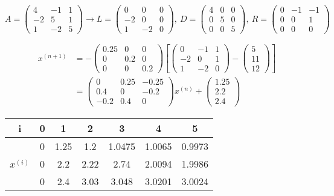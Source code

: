 \documentclass[a4paper,ngerman]{scrbook}
\begin{document}
\[
A =
\begin{pmatrix}
  4 & -1 & 1\\ -2 & 5 & 1\\ 1 & -2 & 5
\end{pmatrix}
 \to L =
 \begin{pmatrix}
   0  & 0 & 0\\ -2 & 0 & 0\\ 1 & -2 & 0
 \end{pmatrix}
 ,\ D=
 \begin{pmatrix}
   4 & 0 & 0\\ 0 & 5 & 0\\ 0 & 0 & 5
 \end{pmatrix}
 ,\ R=
 \begin{pmatrix}
   0 & -1 & -1\\ 0 & 0 & 1\\ 0 & 0 & 0
 \end{pmatrix}
\]


\begin{align*}
  x^{(n+1)} &= -
  \begin{pmatrix}
    0.25 & 0 & 0\\ 0 & 0.2 & 0\\ 0 & 0 & 0.2
  \end{pmatrix}
  \left[
    \begin{pmatrix}
      0 & -1 & 1\\ -2 & 0 & 1\\ 1 & -2 & 0
    \end{pmatrix} -
    \begin{pmatrix}
      5\\ 11\\ 12
    \end{pmatrix}
  \right]\\
  &=
  \begin{pmatrix}
    0 & 0.25 & -0.25\\ 0.4 & 0 & -0.2\\ -0.2 & 0.4 & 0
  \end{pmatrix} x^{(n)} +
  \begin{pmatrix}
    1.25\\ 2.2\\ 2.4
  \end{pmatrix}
\end{align*}

\begin{tabular}{c|c|c|c|c|c|c|}
  i & 0 & 1 & 2 & 3 & 4 & 5\\\hline
  \multirow{3}{*}{$x^{(i)}$} & 0 & 1.25 & 1.2 & 1.0475 & 1.0065 & 0.9973\\\cline{2-7}
  & 0 & 2.2 & 2.22 & 2.74 & 2.0094 & 1.9986\\\cline{2-7}
  & 0 & 2.4 & 3.03 & 3.048 & 3.0201 & 3.0024
\end{tabular}
\end{document}
